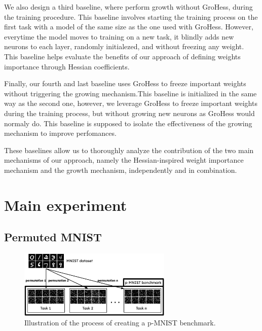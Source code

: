 \documentclass[twocolumn]{article}
\begin{document}
\vspace{2mm}
\noindent
We also design a third baseline, where perform growth without GroHess, during the training procedure. This baseline involves starting the training process on the first task with a model of the same size as the one used with GroHess. However, everytime the model moves to training on a new task, it blindly adds new neurons to each layer, randomly initialezed, and without freezing any weight. This baseline helps evaluate the benefits of our approach of defining weights importance through Hessian coefficients. 

\vspace{2mm}
\noindent
Finally, our fourth and last baseline uses GroHess to freeze important weights without triggering the growing mechanism.This baseline is initialized in the same way as the second one, however, we leverage GroHess to freeze important weights during the training process, but without growing new neurons as GroHess would normaly do. This baseline is supposed to isolate the effectiveness of the growing mechanism to improve perfomances.

\vspace{2mm}
\noindent
These baselines allow us to thoroughly analyze the contribution of the two main mechanisms of our approach, namely the Hessian-inspired weight importance mechanism and the growth mechanism, independently and in combination.



\section{Main experiment}



\subsection{Permuted MNIST}


\begin{figure}
    \centering
    \includegraphics[width=0.65\textwidth]{images/p-MNIST.png}
    \caption{Illustration of the process of creating a p-MNIST benchmark.}
    \label{fig:p-MNIST}
\end{figure}
\end{document}
